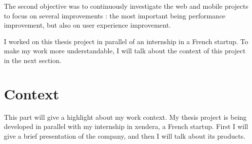 \documentclass{article}
\begin{document}
            The second objective was to continuously investigate the web and mobile projects to focus
            on several improvements : the most important being performance improvement, but also on user experience
            improvement.
            
            \vspace{1cm}

            I worked on this thesis project in parallel of an internship in a French startup. To make
            my work more understandable, I will talk about the context of this project in the next section.


        \newpage
        \section{Context}
            This part will give a highlight about my work context. My thesis project is being developed in
            parallel with my internship in xendera, a French startup. First I will give a brief presentation
            of the company, and then I will talk about its products.
\end{document}

